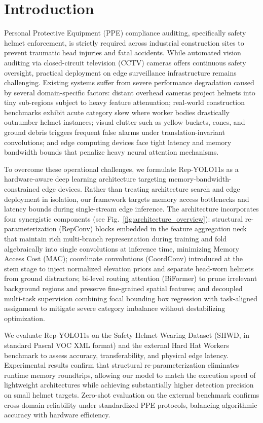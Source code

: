 \documentclass[conference]{IEEEtran}
\begin{document}
\section{Introduction}
\label{sec:intro}
Personal Protective Equipment (PPE) compliance auditing, specifically safety helmet enforcement, is strictly required across industrial construction sites to prevent traumatic head injuries and fatal accidents. While automated vision auditing via closed-circuit television (CCTV) cameras offers continuous safety oversight, practical deployment on edge surveillance infrastructure remains challenging. Existing systems suffer from severe performance degradation caused by several domain-specific factors: distant overhead cameras project helmets into tiny sub-regions subject to heavy feature attenuation; real-world construction benchmarks exhibit acute category skew where worker bodies drastically outnumber helmet instances; visual clutter such as yellow buckets, cones, and ground debris triggers frequent false alarms under translation-invariant convolutions; and edge computing devices face tight latency and memory bandwidth bounds that penalize heavy neural attention mechanisms.

To overcome these operational challenges, we formulate Rep-YOLO11s as a hardware-aware deep learning architecture targeting memory-bandwidth-constrained edge devices. Rather than treating architecture search and edge deployment in isolation, our framework targets memory access bottlenecks and latency bounds during single-stream edge inference. The architecture incorporates four synergistic components (see Fig.~\ref{fig:architecture_overview}): structural re-parameterization (RepConv) blocks embedded in the feature aggregation neck that maintain rich multi-branch representation during training and fold algebraically into single convolutions at inference time, minimizing Memory Access Cost (MAC); coordinate convolutions (CoordConv) introduced at the stem stage to inject normalized elevation priors and separate head-worn helmets from ground distractors; bi-level routing attention (BiFormer) to prune irrelevant background regions and preserve fine-grained spatial features; and decoupled multi-task supervision combining focal bounding box regression with task-aligned assignment to mitigate severe category imbalance without destabilizing optimization.

We evaluate Rep-YOLO11s on the Safety Helmet Wearing Dataset (SHWD, in standard Pascal VOC XML format) and the external Hard Hat Workers benchmark to assess accuracy, transferability, and physical edge latency. Experimental results confirm that structural re-parameterization eliminates runtime memory roundtrips, allowing our model to match the execution speed of lightweight architectures while achieving substantially higher detection precision on small helmet targets. Zero-shot evaluation on the external benchmark confirms cross-domain reliability under standardized PPE protocols, balancing algorithmic accuracy with hardware efficiency.
\end{document}
